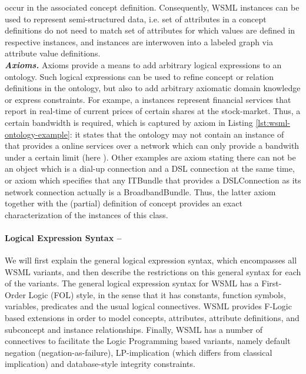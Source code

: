 occur in the associated concept definition. Consequently, WSML
instances can be used to represent semi-structured data, i.e. set
of attributes in a concept definitions do not need to match set
of attributes for which values are defined in respective
instances, and instances are interwoven into a labeled graph via
attribute value definitions.
\\ {\it \bfseries Axioms.} Axioms provide a means to add arbitrary
logical expressions to an ontology. Such logical expressions can
be used to refine concept or relation definitions in the ontology,
but also to add arbitrary axiomatic domain knowledge or express
constraints.
For exampe, a  instances represent financial services
that report in real-time of current prices of certain shares
at the stock-market. Thus, a certain bandwidth is required, which
is captured by axiom 
in Listing \ref{lst:wsml-ontology-example}: it states that the
ontology may not contain an instance of  that
provides a  online services over a network
which can only provide a bandwith under a certain limit (here
). Other examples are axiom 
stating there can not be an object which is a dial-up
connection and a DSL connection at the same time, or axiom
 which specifies that
any ITBundle that provides a DSLConnection as its
network connection actually is a BroadbandBundle. Thus, the latter
axiom together with the (partial) definition of concept
 provides an exact characterization of the
instances of this class.

\paragraph{\small Logical Expression Syntax --}
\label{sec:log-expr-syntax}

We will first explain the general logical expression syntax, which
encompasses all WSML variants, and then describe the restrictions on
this general syntax for each of the variants. The general logical
expression syntax for WSML has a First-Order Logic (FOL) style, in the
sense that it has constants, function symbols, variables, predicates
and the usual logical connectives. WSML provides F-Logic
\cite{Kifer+LausenETAL-LogiFounObjeFram:95} based extensions in
order to model concepts, attributes, attribute definitions, and
subconcept and instance relationships. Finally, WSML has a
number of connectives to facilitate the Logic Programming based
variants, namely default negation (negation-as-failure),
LP-implication (which differs from classical implication) and
database-style integrity constraints.

